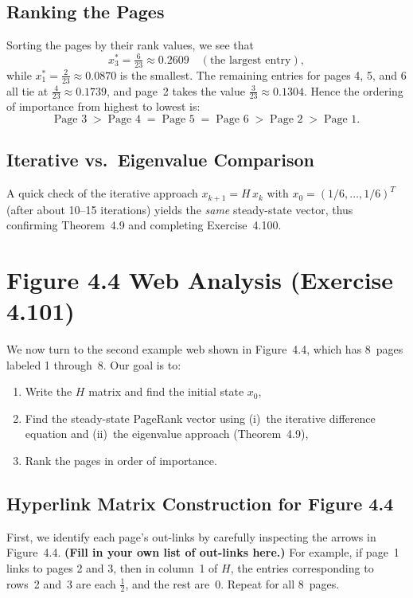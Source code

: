 \documentclass{article}
\begin{document}
\subsection*{Ranking the Pages}
Sorting the pages by their rank values, we see that 
\[
x^*_3 = \tfrac{6}{23} \approx 0.2609 
\quad
(\text{the largest entry}),
\]
while $x^*_1 = \tfrac{2}{23} \approx 0.0870$ 
is the smallest. The remaining entries for 
pages 4, 5, and 6 all tie at $\tfrac{4}{23} \approx 0.1739$, 
and page~2 takes the value $\tfrac{3}{23} \approx 0.1304$. 
Hence the ordering of importance from highest to lowest is:
\[
\text{Page }3 
\;>\;
\text{Page }4 \;=\; \text{Page }5 \;=\; \text{Page }6
\;>\;
\text{Page }2
\;>\;
\text{Page }1.
\]

\subsection*{Iterative vs.\ Eigenvalue Comparison}
A quick check of the iterative approach 
$x_{k+1} = H \, x_k$ with $x_0 = (1/6, \ldots, 1/6)^T$ 
(after about 10--15 iterations) yields the 
\emph{same} steady-state vector, thus confirming 
Theorem~4.9 and completing Exercise~4.100.



\section{Figure 4.4 Web Analysis (Exercise 4.101)}

We now turn to the second example web shown in Figure~4.4, which has 8~pages labeled 
1 through~8. Our goal is to:

\begin{enumerate}
  \item Write the $H$ matrix and find the initial state $x_0$,
  \item Find the steady-state PageRank vector using 
    (i)~the iterative difference equation and 
    (ii)~the eigenvalue approach (Theorem~4.9),
  \item Rank the pages in order of importance.
\end{enumerate}

\subsection{Hyperlink Matrix Construction for Figure 4.4}
First, we identify each page's out-links by carefully inspecting the arrows in Figure~4.4. 
\textbf{(Fill in your own list of out-links here.)}
For example, if page~1 links to pages 2 and 3, then in column~1 of $H$, 
the entries corresponding to rows~2 and~3 are each $\tfrac{1}{2}$, and the rest are~0. 
Repeat for all 8~pages. 
\end{document}
